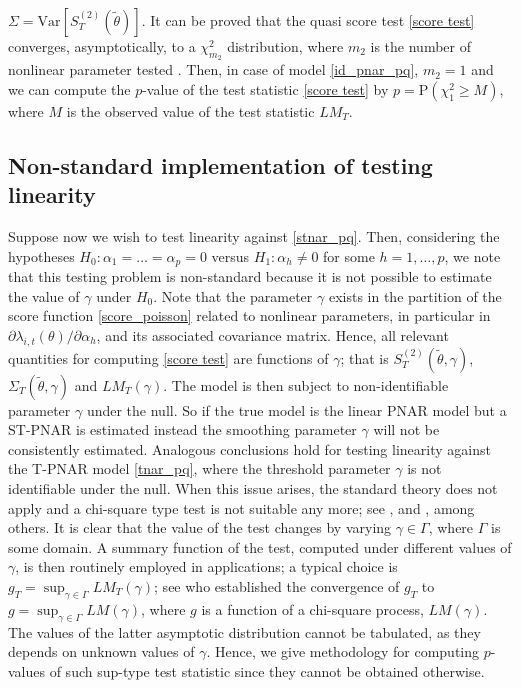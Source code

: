$\Sigma=\mathrm{Var}[S_{T}^{(2)}(\tilde{\theta})]$. It can be proved that the quasi score test \eqref{score test} converges, asymptotically, to a $\chi^2_{m_2}$ distribution, where $m_2$ is the number of nonlinear parameter tested \citep{armillotta_fokianos_2022_testing}. Then, in case of model \eqref{id_pnar_pq}, $m_2=1$ and we can compute the $p$-value of the test statistic \eqref{score test} by 
$p=\mathrm{P}(\chi^2_1\geq M)$, where $M$ is the observed value of the test statistic $LM_T$.  

\subsection{Non-standard implementation of  testing linearity}
\label{subsec testnonstandard}

Suppose now  we wish  to test linearity against \eqref{stnar_pq}. Then, considering the hypotheses 
$ H_0: \alpha_1= \dots = \alpha_p = 0$ versus $H_1: \alpha_h \neq 0$ for some $h=1, \dots, p$,
we note that this testing problem is non-standard  because  it is not possible to estimate the value of  $\gamma$  under  $H_0$. 
Note that the parameter $\gamma$ exists in the partition of the score function \eqref{score_poisson} related to nonlinear parameters, in particular in $\partial\lambda_{i,t}(\theta)/\partial\alpha_h$, and its  associated covariance matrix. Hence, all relevant quantities for computing  \eqref{score test} are  functions of $\gamma$;  that is $S^{(2)}_{T}(\tilde{\theta}, \gamma)$, $\Sigma_{T}(\tilde{\theta}, \gamma)$ and $LM_T(\gamma)$. The model is then subject to non-identifiable parameter $\gamma$ under the null. So if the true model is the linear PNAR model but a ST-PNAR is estimated instead the smoothing parameter $\gamma$ will not be consistently estimated. 
Analogous conclusions hold for testing linearity against the T-PNAR model \eqref{tnar_pq}, where the threshold parameter $\gamma$ is not identifiable under the null. When this issue arises,  the standard theory does not apply and a chi-square type test is not suitable any more; see \cite{davies_1987}, \cite{hansen_1996} and \cite{armillotta_fokianos_2022_testing}, among others. 
It is clear that  the value of the test changes by varying $\gamma\in\Gamma$, where $\Gamma$ is some domain. A summary function of the test, computed under different values of $\gamma$, is then routinely employed in applications; a typical choice is $g_T=\sup_{\gamma\in\Gamma}LM_T(\gamma)$; see  \cite{armillotta_fokianos_2022_testing} who  established the convergence of  $g_T$ to $g=\sup_{\gamma\in\Gamma}LM(\gamma)$, 
where $g$ is a function of a chi-square process, $LM(\gamma)$. The values of the latter asymptotic distribution cannot be tabulated, as they depends on unknown values of $\gamma$.  Hence, we give  methodology for computing $p$-values of  such sup-type test statistic since they cannot be obtained otherwise. 

